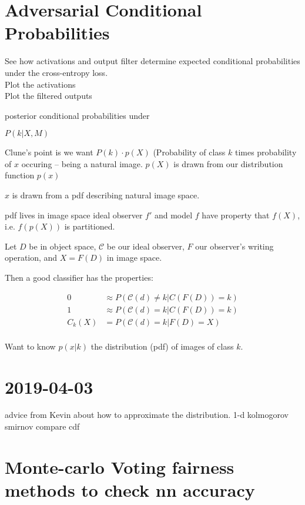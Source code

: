 \documentclass[10pt]{extarticle}\usepackage[letterpaper]{geometry}
\begin{document}
\cite{goodfellow2014generative}


\section{Adversarial Conditional Probabilities}

See how activations and output filter determine expected conditional
probabilities under the cross-entropy loss.\\

Plot the activations\\
Plot the filtered outputs

posterior conditional probabilities under

$P(k | X,M)$

Clune's point is we want $P(k) \cdot p(X)$
(Probability of class $k$ times probability of $x$ occuring -- being a
natural image. $p(X)$ is drawn from our distribution function $p(x)$

$x$ is drawn from a pdf describing natural image space.

pdf lives in image space
ideal observer $f'$ and model $f$ have property that $f(X)$,
i.e. $f(p(X))$ is partitioned.

Let $D$ be in object space, $\mathcal{C}$ be our ideal observer, $F$
our observer's writing operation, and $X = F(D)$ in image space.

Then a good classifier has the properties:

\begin{align*}
  0 &\approx P(\mathcal{C}(d) \neq k | C(F(D)) = k)\\
  1 &\approx P(\mathcal{C}(d) = k | C(F(D)) = k)\\
  C_k(X) &= P(\mathcal{C}(d) = k | F(D) = X)\\  
\end{align*}

Want to know $p(x | k)$ the distribution (pdf) of images of class
$k$.

\section{2019-04-03}
advice from Kevin about how to approximate the distribution. 
1-d kolmogorov smirnov compare cdf

\section{Monte-carlo Voting fairness methods to check nn accuracy}
\end{document}
